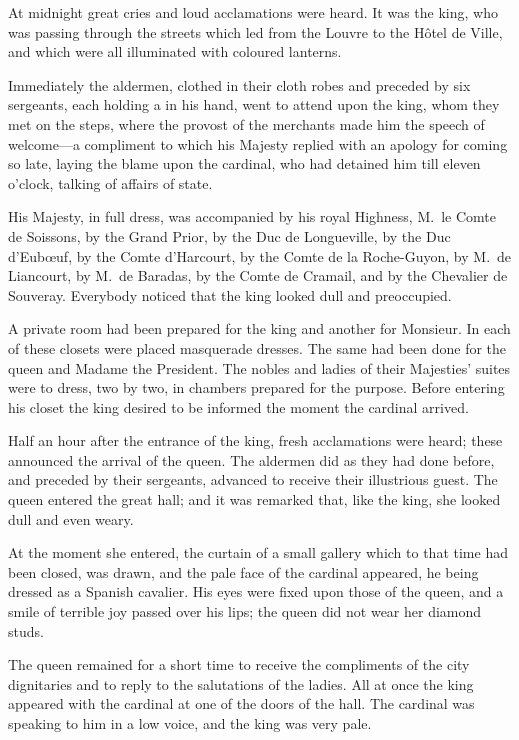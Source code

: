 At midnight great cries and loud acclamations were heard. It was the king, who was passing through the streets which led from the Louvre to the Hôtel de Ville, and which were all illuminated with coloured lanterns. 

Immediately the aldermen, clothed in their cloth robes and preceded by six sergeants, each holding a  in his hand, went to attend upon the king, whom they met on the steps, where the provost of the merchants made him the speech of welcome—a compliment to which his Majesty replied with an apology for coming so late, laying the blame upon the cardinal, who had detained him till eleven o'clock, talking of affairs of state. 

His Majesty, in full dress, was accompanied by his royal Highness, M.~le Comte de Soissons, by the Grand Prior, by the Duc de Longueville, by the Duc d'Eubœuf, by the Comte d'Harcourt, by the Comte de la Roche-Guyon, by M.~de Liancourt, by M.~de Baradas, by the Comte de Cramail, and by the Chevalier de Souveray. Everybody noticed that the king looked dull and preoccupied. 

A private room had been prepared for the king and another for Monsieur. In each of these closets were placed masquerade dresses. The same had been done for the queen and Madame the President. The nobles and ladies of their Majesties' suites were to dress, two by two, in chambers prepared for the purpose. Before entering his closet the king desired to be informed the moment the cardinal arrived. 

Half an hour after the entrance of the king, fresh acclamations were heard; these announced the arrival of the queen. The aldermen did as they had done before, and preceded by their sergeants, advanced to receive their illustrious guest. The queen entered the great hall; and it was remarked that, like the king, she looked dull and even weary. 

At the moment she entered, the curtain of a small gallery which to that time had been closed, was drawn, and the pale face of the cardinal appeared, he being dressed as a Spanish cavalier. His eyes were fixed upon those of the queen, and a smile of terrible joy passed over his lips; the queen did not wear her diamond studs. 

The queen remained for a short time to receive the compliments of the city dignitaries and to reply to the salutations of the ladies. All at once the king appeared with the cardinal at one of the doors of the hall. The cardinal was speaking to him in a low voice, and the king was very pale. 

